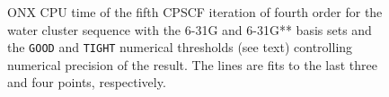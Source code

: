 \documentclass[prl,twocolumn,showpacs,twocolumngrid,superbib]{revtex4}
\begin{document}
{\begin{figure}[h]
  \caption{\protect
    ONX CPU time of the fifth CPSCF iteration of fourth order for
    the water cluster sequence with the 6-31G and 6-31G** 
    basis sets and the {\tt GOOD} and {\tt TIGHT} 
    numerical thresholds (see text) controlling numerical
    precision of the result. The lines are fits to the 
    last three and four points, respectively.
  }\label{fig:Gamma_ONX_Timing}
\end{figure}

}
\end{document}
